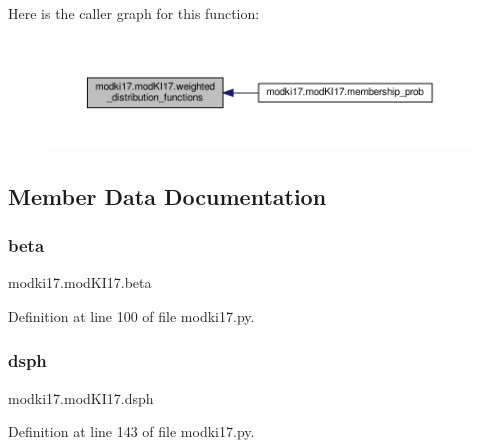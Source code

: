 Here is the caller graph for this function\+:\nopagebreak
\begin{figure}[H]
\begin{center}
\leavevmode
\includegraphics[width=350pt]{df/da3/classmodki17_1_1modKI17_abab55a25d43afbd5737246fd8da155f7_icgraph}
\end{center}
\end{figure}


\subsection{Member Data Documentation}
\mbox{\label{classmodki17_1_1modKI17_add6ca2ccf70e3fbc0d517efec833e797}} 
\subsubsection{\texorpdfstring{beta}{beta}}
{\footnotesize\ttfamily modki17.\+mod\+K\+I17.\+beta}



Definition at line 100 of file modki17.\+py.

\mbox{\label{classmodki17_1_1modKI17_a72b197ab9f29a3a2768f9becda673413}} 
\subsubsection{\texorpdfstring{dsph}{dsph}}
{\footnotesize\ttfamily modki17.\+mod\+K\+I17.\+dsph}



Definition at line 143 of file modki17.\+py.

\mbox{\label{classmodki17_1_1modKI17_ab1da6423024d2343a70508572859af80}} 
